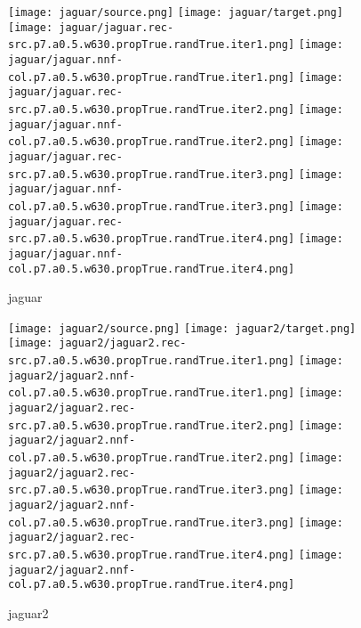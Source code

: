 \documentclass{article}
\begin{document}
\begin{figure}[H]
\centering
\texttt{[image: jaguar/source.png]}\enskip
\texttt{[image: jaguar/target.png]}
\texttt{[image: jaguar/jaguar.rec-src.p7.a0.5.w630.propTrue.randTrue.iter1.png]}\enskip
\texttt{[image: jaguar/jaguar.nnf-col.p7.a0.5.w630.propTrue.randTrue.iter1.png]}
\texttt{[image: jaguar/jaguar.rec-src.p7.a0.5.w630.propTrue.randTrue.iter2.png]}\enskip
\texttt{[image: jaguar/jaguar.nnf-col.p7.a0.5.w630.propTrue.randTrue.iter2.png]}
\texttt{[image: jaguar/jaguar.rec-src.p7.a0.5.w630.propTrue.randTrue.iter3.png]}\enskip
\texttt{[image: jaguar/jaguar.nnf-col.p7.a0.5.w630.propTrue.randTrue.iter3.png]}
\texttt{[image: jaguar/jaguar.rec-src.p7.a0.5.w630.propTrue.randTrue.iter4.png]}\enskip
\texttt{[image: jaguar/jaguar.nnf-col.p7.a0.5.w630.propTrue.randTrue.iter4.png]}
\caption{jaguar}
\end{figure}

\begin{figure}[H]
\centering
\texttt{[image: jaguar2/source.png]}\enskip
\texttt{[image: jaguar2/target.png]}
\texttt{[image: jaguar2/jaguar2.rec-src.p7.a0.5.w630.propTrue.randTrue.iter1.png]}\enskip
\texttt{[image: jaguar2/jaguar2.nnf-col.p7.a0.5.w630.propTrue.randTrue.iter1.png]}
\texttt{[image: jaguar2/jaguar2.rec-src.p7.a0.5.w630.propTrue.randTrue.iter2.png]}\enskip
\texttt{[image: jaguar2/jaguar2.nnf-col.p7.a0.5.w630.propTrue.randTrue.iter2.png]}
\texttt{[image: jaguar2/jaguar2.rec-src.p7.a0.5.w630.propTrue.randTrue.iter3.png]}\enskip
\texttt{[image: jaguar2/jaguar2.nnf-col.p7.a0.5.w630.propTrue.randTrue.iter3.png]}
\texttt{[image: jaguar2/jaguar2.rec-src.p7.a0.5.w630.propTrue.randTrue.iter4.png]}\enskip
\texttt{[image: jaguar2/jaguar2.nnf-col.p7.a0.5.w630.propTrue.randTrue.iter4.png]}
\caption{jaguar2}
\end{figure}
\end{document}
